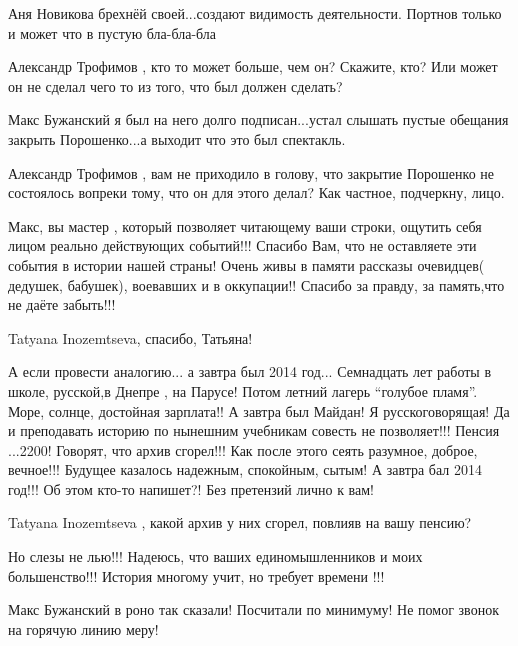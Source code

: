 \begin{itemize}
\begin{itemize}
Аня Новикова брехнёй своей...создают видимость деятельности. Портнов только и может что в пустую бла-бла-бла

Александр Трофимов , кто то может больше, чем он? Скажите, кто? Или может он не сделал чего то из того, что был должен сделать?

Макс Бужанский я был на него долго подписан...устал слышать пустые обещания закрыть Порошенко...а выходит что это был спектакль.

Александр Трофимов , вам не приходило в голову, что закрытие Порошенко не состоялось вопреки тому, что он для этого делал? Как частное, подчеркну, лицо.
\end{itemize}


Макс, вы мастер , который позволяет читающему ваши строки, ощутить себя лицом
реально действующих событий!!! Спасибо Вам, что не оставляете эти события в
истории нашей страны! Очень живы в памяти рассказы очевидцев( дедушек,
бабушек), воевавших и в оккупации!! Спасибо за правду, за память,что не даёте
забыть!!!

\begin{itemize}
Tatyana Inozemtseva, спасибо, Татьяна!


А если провести аналогию... а завтра был 2014 год...  Семнадцать лет работы в
школе, русской,в Днепре , на Парусе! Потом летний лагерь \enquote{голубое
пламя}. Море, солнце, достойная зарплата!! А завтра был Майдан! Я
русскоговорящая! Да и преподавать историю по нынешним учебникам совесть не
позволяет!!! Пенсия ...2200! Говорят, что архив сгорел!!! Как после этого сеять
разумное, доброе, вечное!!! Будущее казалось надежным, спокойным, сытым! А
завтра бал 2014 год!!! Об этом кто-то напишет?! Без претензий лично к вам!

Tatyana Inozemtseva , какой архив у них сгорел, повлияв на вашу пенсию?

Но слезы не лью!!! Надеюсь, что ваших единомышленников и моих большенство!!! История многому учит, но требует времени !!!


Макс Бужанский в роно так сказали! Посчитали по минимуму! Не помог звонок на горячую линию меру!



\end{itemize}
\end{itemize}
